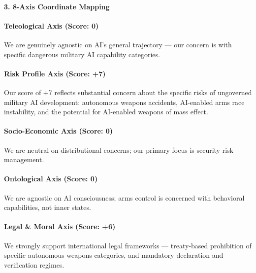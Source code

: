 \paragraph{3. 8-Axis Coordinate
Mapping}\label{axis-coordinate-mapping-25}

\paragraph{Teleological Axis (Score:
0)}\label{teleological-axis-score-0-1}

We are genuinely agnostic on AI's general trajectory --- our concern is
with specific dangerous military AI capability categories.

\paragraph{Risk Profile Axis (Score:
+7)}\label{risk-profile-axis-score-7-3}

Our score of +7 reflects substantial concern about the specific risks of
ungoverned military AI development: autonomous weapons accidents,
AI-enabled arms race instability, and the potential for AI-enabled
weapons of mass effect.

\paragraph{Socio-Economic Axis (Score:
0)}\label{socio-economic-axis-score-0}

We are neutral on distributional concerns; our primary focus is security
risk management.

\paragraph{Ontological Axis (Score:
0)}\label{ontological-axis-score-0-10}

We are agnostic on AI consciousness; arms control is concerned with
behavioral capabilities, not inner states.

\paragraph{Legal \& Moral Axis (Score:
+6)}\label{legal-moral-axis-score-6}

We strongly support international legal frameworks --- treaty-based
prohibition of specific autonomous weapons categories, and mandatory
declaration and verification regimes.

